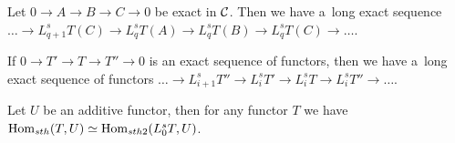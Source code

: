     \begin{proposition}
        Let $0 \to A \to B \to C \to 0$ be exact in $\mathcal{C}$.
        Then we have a~long exact sequence
        $\ldots \to L_{q+1}^s T(C) \to L_q^sT(A) \to L_q^sT(B) \to L_q^sT(C) \to \ldots$.
    \end{proposition}
    
    \begin{proposition}
        If $0 \to T' \to T \to T'' \to 0$ is an exact sequence of functors,
        then we have a~long exact sequence of functors
        $\ldots \to L_{i+1}^s T'' \to L_i^s T' \to L_i^s T \to L_i^s T'' \to \ldots$.
    \end{proposition}
    
    \begin{proposition}
        Let $U$ be an additive functor, then for any functor $T$ we have
        $\operatorname{Hom}_{sth}(T,U) \simeq \operatorname{Hom}_{sth2}(L^s_0 T,U)$.
    \end{proposition}


 
 